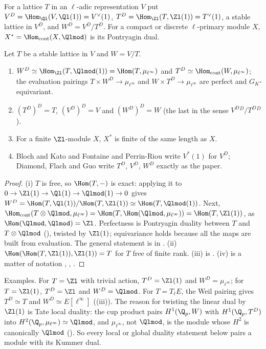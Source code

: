 \begin{definition}\label{def:blochkato:duals}
For a lattice $T$ in an $\ell$-adic representation $V$ put $V^D=\Hom_{\Ql}(V,\Ql(1))=V^\vee(1)$, $T^D=\Hom_{\Zl}(T,\Zl(1))=T^\vee(1)$, a stable lattice in $V^D$,
and $W^D=V^D/T^D$. For a compact or discrete $\ell$-primary module $X$, $X^*=\Hom_{\mathrm{cont}}(X,\Qlmod)$ is its Pontryagin dual.
\end{definition}

\begin{proposition}\label{prop:blochkato:duals}
Let $T$ be a stable lattice in $V$ and $W=V/T$.
\begin{enumerate}[label=(\roman*)]
\item $W^D\simeq\Hom_{\Zl}(T,\Qlmod(1))=\Hom(T,\mu_{\ell^\infty})$ and $T^D\simeq\Hom_{\mathrm{cont}}(W,\mu_{\ell^\infty})$; the evaluation pairings $T\times W^D\to\mu_{\ell^\infty}$ and
$W\times T^D\to\mu_{\ell^\infty}$ are perfect and $G_K$-equivariant.
\item $(T^D)^D=T$, $(V^D)^D=V$ and $(W^D)^D=W$ (the last in the sense $V^D{}^D/T^D{}^D$).
\item For a finite $\Zl$-module $X$, $X^*$ is finite of the same length as $X$.
\item Bloch and Kato and Fontaine and Perrin-Riou write $V^*(1)$ for $V^D$; Diamond, Flach and Guo write $T^D$, $V^D$, $W^D$ exactly as the paper.
\end{enumerate}
\end{proposition}

\begin{proof}
\sloppy (i) $T$ is free, so $\Hom(T,-)$ is exact: applying it to $0\to\Zl(1)\to\Ql(1)\to\Qlmod(1)\to0$ gives $W^D=\Hom(T,\Ql(1))/\Hom(T,\Zl(1))\simeq\Hom(T,\Qlmod(1))$. Next,
$\Hom_{\mathrm{cont}}(T\otimes\Qlmod,\mu_{\ell^\infty})=\Hom(T,\Hom(\Qlmod,\mu_{\ell^\infty}))=\Hom(T,\Zl(1))$, as $\Hom(\Qlmod,\Qlmod)=\Zl$. Perfectness is
Pontryagin duality between $T$ and $T\otimes\Qlmod$ (), twisted by $\Zl(1)$; equivariance holds because all the maps are built from
evaluation. The general statement is in . (ii) $\Hom(\Hom(T,\Zl(1)),\Zl(1))=T$ for $T$ free of finite rank. (iii) is . (iv) is
a matter of notation \cite[Section 3]{BlochKato}, \cite{FPR94}, \cite[Section 2.1]{DFG04}.
\end{proof}

Examples. For $T=\Zl$ with trivial action, $T^D=\Zl(1)$ and $W^D=\mu_{\ell^\infty}$; for $T=\Zl(1)$, $T^D=\Zl$ and $W^D=\Qlmod$. For $T=T_\ell E$, the Weil pairing gives $T^D\simeq T$
and $W^D\simeq E[\ell^\infty]$ ((iii)). The reason for twisting the linear dual by $\Zl(1)$ is Tate local duality: the cup product pairs
$H^1(\Q_p,W)$ with $H^1(\Q_p,T^D)$ into $H^2(\Q_p,\mu_{\ell^\infty})\simeq\Qlmod$, and $\mu_{\ell^\infty}$, not $\Qlmod$, is the module whose $H^2$ is canonically $\Qlmod$ ().
So every local or global duality statement below pairs a module with its Kummer dual.

